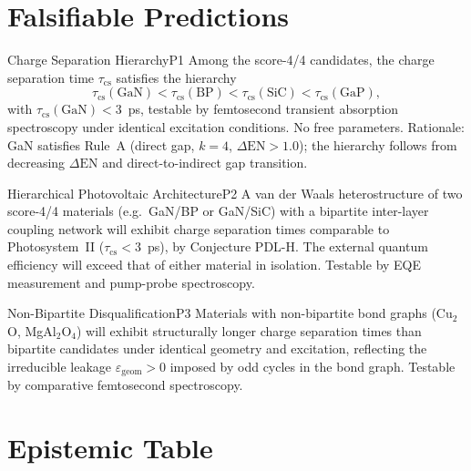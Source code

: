 \documentclass[12pt,a4paper]{article}
\newcommand{\epsgeom}{\varepsilon_{\mathrm{geom}}}
\newcommand{\DEN}{\Delta\mathrm{EN}}
\begin{document}
\section{Falsifiable Predictions}
\label{sec:predictions}

\begin{prediction}{Charge Separation Hierarchy}{P1}
Among the score-4/4 candidates, the charge separation time $\tau_{\mathrm{cs}}$
satisfies the hierarchy
\[
  \tau_{\mathrm{cs}}(\mathrm{GaN})
  < \tau_{\mathrm{cs}}(\mathrm{BP})
  < \tau_{\mathrm{cs}}(\mathrm{SiC})
  < \tau_{\mathrm{cs}}(\mathrm{GaP}),
\]
with $\tau_{\mathrm{cs}}(\mathrm{GaN}) < 3$~ps, testable by femtosecond
transient absorption spectroscopy under identical excitation conditions.
No free parameters. Rationale: GaN satisfies Rule~A (direct gap, $k=4$,
$\DEN > 1.0$); the hierarchy follows from decreasing $\DEN$ and
direct-to-indirect gap transition.
\end{prediction}

\begin{prediction}{Hierarchical Photovoltaic Architecture}{P2}
A van der Waals heterostructure of two score-4/4 materials (e.g.\
GaN/BP or GaN/SiC) with a bipartite inter-layer coupling network will
exhibit charge separation times comparable to Photosystem~II
($\tau_{\mathrm{cs}} < 3$~ps), by Conjecture PDL-H. The external
quantum efficiency will exceed that of either material in isolation.
Testable by EQE measurement and pump-probe spectroscopy.
\end{prediction}

\begin{prediction}{Non-Bipartite Disqualification}{P3}
Materials with non-bipartite bond graphs (Cu$_2$O, MgAl$_2$O$_4$)
will exhibit structurally longer charge separation times than bipartite
candidates under identical geometry and excitation, reflecting the
irreducible leakage $\epsgeom > 0$ imposed by odd cycles in the bond
graph. Testable by comparative femtosecond spectroscopy.
\end{prediction}

\section{Epistemic Table}
\label{sec:epistemic}
\end{document}
